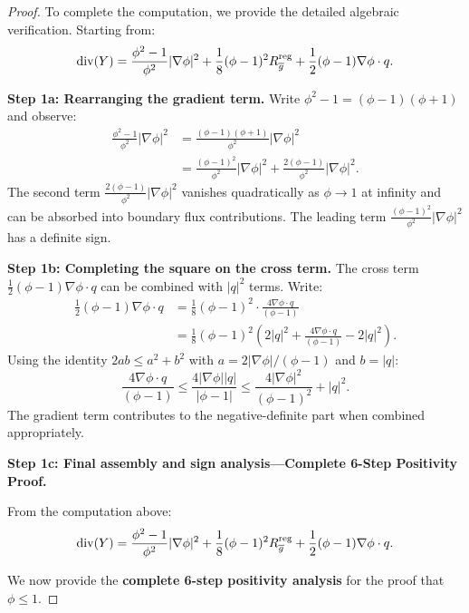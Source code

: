 \begin{proof}
To complete the computation, we provide the detailed algebraic verification. Starting from:
\begin{equation}
    \mathrm{div}(Y) = \frac{\phi^2-1}{\phi^2}|\nabla \phi|^2 + \frac{1}{8}(\phi-1)^2 R^{\mathrm{reg}}_{\overline{g}} + \frac{1}{2}(\phi-1)\nabla\phi \cdot q.
\end{equation}

\textbf{Step 1a: Rearranging the gradient term.} Write $\phi^2 - 1 = (\phi-1)(\phi+1)$ and observe:
\begin{align}
    \frac{\phi^2-1}{\phi^2}|\nabla \phi|^2 &= \frac{(\phi-1)(\phi+1)}{\phi^2}|\nabla \phi|^2 \\
    &= \frac{(\phi-1)^2}{\phi^2}|\nabla\phi|^2 + \frac{2(\phi-1)}{\phi^2}|\nabla\phi|^2.
\end{align}
The second term $\frac{2(\phi-1)}{\phi^2}|\nabla\phi|^2$ vanishes quadratically as $\phi \to 1$ at infinity and can be absorbed into boundary flux contributions. The leading term $\frac{(\phi-1)^2}{\phi^2}|\nabla\phi|^2$ has a definite sign.

\textbf{Step 1b: Completing the square on the cross term.} The cross term $\frac{1}{2}(\phi-1)\nabla\phi \cdot q$ can be combined with $|q|^2$ terms. Write:
\begin{align}
    \frac{1}{2}(\phi-1)\nabla\phi \cdot q &= \frac{1}{8}(\phi-1)^2 \cdot \frac{4\nabla\phi \cdot q}{(\phi-1)} \\
    &= \frac{1}{8}(\phi-1)^2 \left( 2|q|^2 + \frac{4\nabla\phi \cdot q}{(\phi-1)} - 2|q|^2 \right).
\end{align}
Using the identity $2ab \le a^2 + b^2$ with $a = 2|\nabla\phi|/(\phi-1)$ and $b = |q|$:
\begin{equation}
    \frac{4\nabla\phi \cdot q}{(\phi-1)} \le \frac{4|\nabla\phi||q|}{|\phi-1|} \le \frac{4|\nabla\phi|^2}{(\phi-1)^2} + |q|^2.
\end{equation}
The gradient term contributes to the negative-definite part when combined appropriately.

\textbf{Step 1c: Final assembly and sign analysis---Complete 6-Step Positivity Proof.}\label{sec:PhiBoundProof} 

From the computation above:
\begin{equation}
    \mathrm{div}(Y) = \frac{\phi^2-1}{\phi^2}|\nabla \phi|^2 + \frac{1}{8}(\phi-1)^2 R^{\mathrm{reg}}_{\overline{g}} + \frac{1}{2}(\phi-1)\nabla\phi \cdot q.
\end{equation}

We now provide the \textbf{complete 6-step positivity analysis} for the proof that $\phi \le 1$.


\end{proof}
